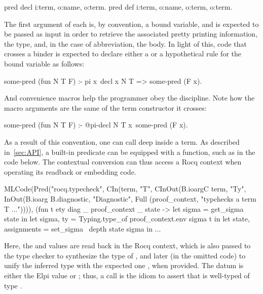 \documentclass{these-ISSS}
\newenvironment{elpicode}
  {\VerbatimEnvironment\begin{elpibox}\begin{xelpicode}}{\end{xelpicode}
\end{elpibox}}
\newenvironment{ocamlcode}
  {\VerbatimEnvironment\begin{ocamlbox}\begin{xocamlcode}}{\end{xocamlcode}
\end{ocamlbox}}
\begin{document}
\begin{elpicode}
pred decl i:term, o:name, o:term.                 %
pred def  i:term, o:name, o:term, o:term.         %
\end{elpicode}

The first argument of each is, by convention, a bound variable, and is
expected to be passed as input in order to retrieve the associated pretty
printing information, the type, and, in the case of abbreviation, the body. In
light of this, code that crosses a binder is expected to declare either a
 or a  hypothetical rule for the bound variable as
follows:
\begin{elpicode}
some-pred (fun N T F) :-
  pi x\ decl x N T => some-pred (F x).
\end{elpicode}
\noindent
And convenience macros help the programmer obey the discipline. Note how
the macro arguments are the same of the term constructor it crosses:
\begin{elpicode}
some-pred (fun N T F) :-
  @pi-decl N T x\ some-pred (F x).
\end{elpicode}
\noindent
As a result of this convention, one can call  deep inside
a term. As described in~\cref{sec:API}, a built-in predicate can be equipped with a
 function, such as  in the code
below. The  contextual conversion can thus access a Rocq context
when operating its readback or embedding code.

\begin{ocamlcode}
MLCode(Pred("rocq.typecheck",
  CIn(term, "T",
  CInOut(B.ioargC term, "Ty",
  InOut(B.ioarg B.diagnostic, "Diagnostic",
  Full (proof_context, "typchecks a term T ...")))),
    (fun t ety diag _ proof_context _ state ->
      let sigma = get_sigma state in
      let sigma, ty = Typing.type_of proof_context.env sigma t in
      let state, assignments = set_sigma ~depth state sigma in
      ...
\end{ocamlcode}


Here, the  and  values are read back in the
 Rocq context, which is also passed to the type
checker to synthesize the type of , and later (in the omitted code)
to unify the inferred type with the expected one , when provided.
The  datum is either the Elpi value  or
; thus, a call  is the
idiom to assert that  is well-typed of type .
~\\
\end{document}
